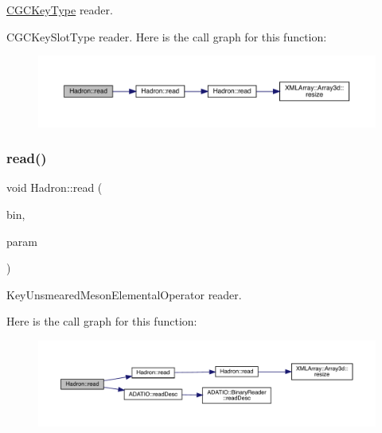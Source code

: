 \mbox{\hyperlink{structHadron_1_1CGCKeyType}{C\+G\+C\+Key\+Type}} reader. 

C\+G\+C\+Key\+Slot\+Type reader. Here is the call graph for this function\+:
\nopagebreak
\begin{figure}[H]
\begin{center}
\leavevmode
\includegraphics[width=350pt]{d1/daf/namespaceHadron_a0fa916d0de711ad2cf389173ad463f51_cgraph}
\end{center}
\end{figure}
\mbox{\label{namespaceHadron_a1a172c91f55bd8989d9751c7f8b5ac28}} 
\subsubsection{\texorpdfstring{read()}{read()}\hspace{0.1cm}{\footnotesize\ttfamily [26/94]}}
{\footnotesize\ttfamily void Hadron\+::read (\begin{DoxyParamCaption}\item[{\mbox{\hyperlink{classADATIO_1_1BinaryReader}{Binary\+Reader}} \&}]{bin,  }\item[{\mbox{\hyperlink{structHadron_1_1KeyUnsmearedMesonElementalOperator__t}{Key\+Unsmeared\+Meson\+Elemental\+Operator\+\_\+t}} \&}]{param }\end{DoxyParamCaption})}



Key\+Unsmeared\+Meson\+Elemental\+Operator reader. 

Here is the call graph for this function\+:
\nopagebreak
\begin{figure}[H]
\begin{center}
\leavevmode
\includegraphics[width=350pt]{d1/daf/namespaceHadron_a1a172c91f55bd8989d9751c7f8b5ac28_cgraph}
\end{center}
\end{figure}
\mbox{\label{namespaceHadron_a0651834c5f37836ea0e1e081b4214546}} 
